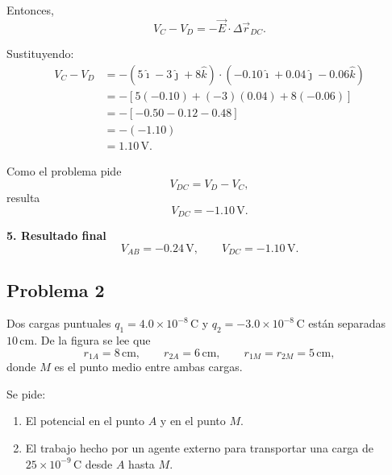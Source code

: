 \documentclass[11pt]{article}
\begin{document}
Entonces,
\begin{equation*}
    V_C-V_D=-\vec E\cdot\Delta \vec r_{DC}.
\end{equation*}

Sustituyendo:
\begin{align*}
    V_C-V_D
    &=-\left(5\hat{\imath}-3\hat{\jmath}+8\hat{k}\right)\cdot
      \left(-0.10\hat{\imath}+0.04\hat{\jmath}-0.06\hat{k}\right)\\
    &=-\left[5(-0.10)+(-3)(0.04)+8(-0.06)\right]\\
    &=-\left[-0.50-0.12-0.48\right]\\
    &=-(-1.10)\\
    &=1.10\,\text{V}.
\end{align*}

Como el problema pide
\begin{equation*}
    V_{DC}=V_D-V_C,
\end{equation*}
resulta
\begin{equation*}
    \boxed{V_{DC}=-1.10\,\text{V}.}
\end{equation*}

\textbf{5. Resultado final}
\begin{equation*}
    \boxed{V_{AB}=-0.24\,\text{V}},
    \qquad
    \boxed{V_{DC}=-1.10\,\text{V}}.
\end{equation*}

\newpage

\subsection*{Problema 2}
Dos cargas puntuales $q_1=4.0\times 10^{-8}\,\text{C}$ y $q_2=-3.0\times 10^{-8}\,\text{C}$ est\'an separadas $10\,\text{cm}$. De la figura se lee que
\begin{equation*}
    r_{1A}=8\,\text{cm},
    \qquad
    r_{2A}=6\,\text{cm},
    \qquad
    r_{1M}=r_{2M}=5\,\text{cm},
\end{equation*}
donde $M$ es el punto medio entre ambas cargas.

Se pide:
\begin{enumerate}[label=(\alph*)]
    \item El potencial en el punto $A$ y en el punto $M$.
    \item El trabajo hecho por un agente externo para transportar una carga de $25\times 10^{-9}\,\text{C}$ desde $A$ hasta $M$.
\end{enumerate}
\end{document}
